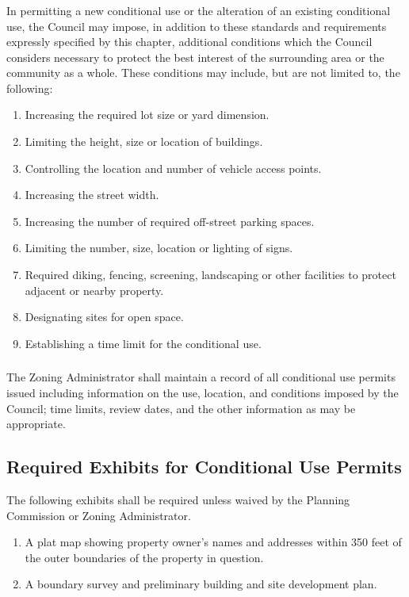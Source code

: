 \subsubsection{}
In permitting a new conditional use or the alteration of an existing conditional use, the Council may impose, in addition to these standards and requirements expressly specified by this chapter, additional conditions which the Council considers necessary to protect the best interest of the surrounding area or the community as a whole. These conditions may include, but are not limited to, the following:
\begin{enumerate}[{\indent}a)]
    \item Increasing the required lot size or yard dimension.
    \item Limiting the height, size or location of buildings.
    \item Controlling the location and number of vehicle access points.
    \item Increasing the street width.
    \item Increasing the number of required off-street parking spaces.
    \item Limiting the number, size, location or lighting of signs.
    \item Required diking, fencing, screening, landscaping or other facilities to protect adjacent or nearby property.
    \item Designating sites for open space.
    \item Establishing a time limit for the conditional use.
\end{enumerate}
\subsubsection{}
The Zoning Administrator shall maintain a record of all conditional use permits issued including information on the use, location, and conditions imposed by the Council; time limits, review dates, and the other information as may be appropriate.
\subsection{Required Exhibits for Conditional Use Permits}
The following exhibits shall be required unless waived by the Planning Commission or Zoning Administrator.
\begin{enumerate}[{\indent}1)]
    \item A plat map showing property owner’s names and addresses within 350 feet of the outer boundaries of the property in question.
    \item A boundary survey and preliminary building and site development plan.
\end{enumerate}
